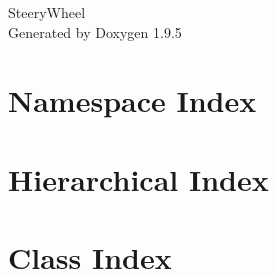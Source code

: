 \documentclass[twoside]{book}
\newcommand{\+}{\discretionary{\mbox{\scriptsize$\hookleftarrow$}}{}{}}
\newcommand{\clearemptydoublepage}{%
    \newpage{\pagestyle{empty}\cleardoublepage}%
  }
\begin{document}
  \raggedbottom
    \hypersetup{pageanchor=false,
                bookmarksnumbered=true,
                pdfencoding=unicode
               }
  \begin{titlepage}
  \vspace*{7cm}
  \begin{center}%
  {\Large Steery\+Wheel}\\
  \vspace*{1cm}
  {\large Generated by Doxygen 1.9.5}\\
  \end{center}
  \end{titlepage}
  \clearemptydoublepage
  \tableofcontents
  \clearemptydoublepage
  \hypersetup{pageanchor=true}
\chapter{Namespace Index}

\chapter{Hierarchical Index}

\chapter{Class Index}

\end{document}
